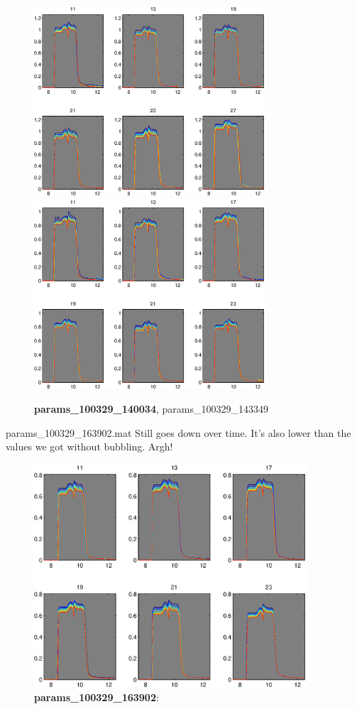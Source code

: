 \documentclass[a4paper]{report}
\begin{document}
\begin{figure}[h]
\centering
\includegraphics[width=3.4in]{params_100329_140034.eps}
\includegraphics[width=3.4in]{params_100329_143349.eps}
\caption{\textbf{params\_100329\_140034}, params\_100329\_143349}
\end{figure}

params\_100329\_163902.mat Still goes down over time. 
It's also lower than the values we got without bubbling. Argh!

\begin{figure}[h]
\centering
\includegraphics[width=4in]{params_100329_163902.eps}
\caption{\textbf{params\_100329\_163902}:}
\end{figure}
\end{document}
